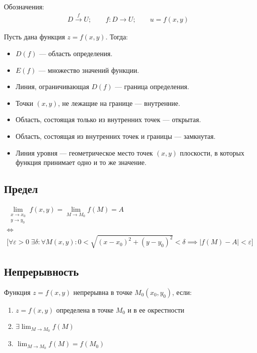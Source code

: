 \documentclass[a4paper,12pt,oneside]{extbook}
\theoremstyle{numbered}
\theoremstyle{unnumbered}
\theoremstyle{named}
\theoremstyle{unnumbered}
\theoremstyle{named}
\theoremstyle{named}
\theoremstyle{named}
\begin{document}
Обозначения:
\begin{gather*}
    D \overset{f} \rightarrow U; \qquad f: D \rightarrow U; \qquad u = f(x, y)
\end{gather*}


Пусть дана функция \(z = f(x, y)\). Тогда:
\begin{itemize}
    \item {\(D(f)\) — область определения.}
    \item {\(E(f)\) — множество значений функции.}
    \item {Линия, ограничивающая \(D(f)\) — граница определения.}
    \item {Точки \((x, y)\), не лежащие на границе — внутренние.}
    \item {Область, состоящая только из внутренних точек — открытая.}
    \item {Область, состоящая из внутренних точек и границы — замкнутая.}
    \item {Линия уровня — геометрическое место точек \((x, y)\) плоскости, в которых функция принимает одно и то же значение.}
\end{itemize}


\subsection{Предел}%
\label{sub:Предел}
\begin{gather*}
    \lim_{\substack{x \to x_0 \\ y \to y_0}}{f(x, y)} = \lim_{M \to M_0}{f(M)} = A \\
    \iff \\
    \Big[ \forall \varepsilon > 0 \; \exists \delta: \forall M(x, y): 0 < \sqrt{(x - x_0)^2 + (y - y_0)^2} < \delta \implies |f(M) - A| < \varepsilon \Big]
\end{gather*}

\subsection{Непрерывность}%
\label{sub:Непрерывность}

Функция \(z = f(x, y)\) непрерывна в точке \(M_0(x_0, y_0)\), если:
\begin{enumerate}
    \item {\(z = f(x, y)\) определена в точке \(M_0\) и в ее окрестности}
    \item {\(\exists \displaystyle \lim_{M \to M_0}{f(M)}\)}
    \item {\(\displaystyle \lim_{M \to M_0}{f(M)} = f(M_0)\)}
\end{enumerate}
\end{document}
